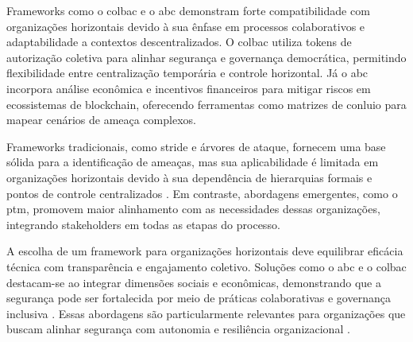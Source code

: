 Frameworks como o \gls{colbac} e o \gls{abc} demonstram forte
compatibilidade com organizações horizontais devido à sua ênfase em
processos colaborativos e adaptabilidade a contextos descentralizados.
O  \gls{colbac} utiliza tokens de autorização coletiva para alinhar segurança
e governança democrática, permitindo flexibilidade entre centralização
temporária e controle horizontal. Já o \gls{abc} incorpora análise
econômica e incentivos financeiros para mitigar riscos em ecossistemas
de blockchain, oferecendo ferramentas como matrizes de conluio para
mapear cenários de ameaça complexos.

Frameworks tradicionais, como \gls{stride} e árvores de ataque, fornecem uma
base sólida para a identificação de ameaças, mas sua aplicabilidade é
limitada em organizações horizontais devido à sua dependência de
hierarquias formais e pontos de controle centralizados
\cite{ThreatModelingdesigningForSecurity, AttackTrees}.
Em contraste, abordagens emergentes, como o \gls{ptm},
promovem maior alinhamento com as necessidades dessas organizações,
integrando stakeholders em todas as etapas do processo.

A escolha de um framework para organizações horizontais deve
equilibrar eficácia técnica com transparência e engajamento coletivo.
Soluções como o \gls{abc} e o  \gls{colbac} destacam-se ao integrar dimensões
sociais e econômicas, demonstrando que a segurança pode ser
fortalecida por meio de práticas colaborativas e governança inclusiva
\cite{AbcCrypto, Colbac}.
Essas abordagens são particularmente relevantes para organizações que
buscam alinhar segurança com autonomia e resiliência organizacional \cite{Colbac}.
